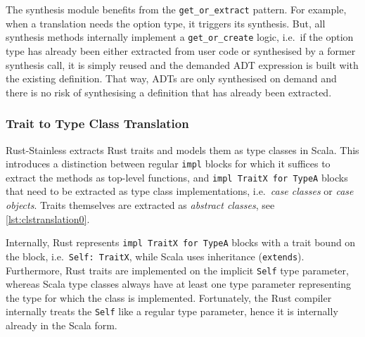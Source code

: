 The synthesis module benefits from the \lstinline!get_or_extract! pattern. For
example, when a translation needs the option type, it triggers its synthesis.
But, all synthesis methods internally implement a \lstinline!get_or_create!
logic, i.e.~if the option type has already been either extracted from user code
or synthesised by a former synthesis call, it is simply reused and the demanded
ADT expression is built with the existing definition. That way, ADTs are only
synthesised on demand and there is no risk of synthesising a definition that has
already been extracted.

\subsubsection{Trait to Type Class Translation}
\label{type-class-extraction}

Rust-Stainless extracts Rust traits and models them as type classes in Scala.
This introduces a distinction between regular \lstinline!impl! blocks for which
it suffices to extract the methods as top-level functions, and
\passthrough{\lstinline!impl TraitX for TypeA!} blocks that need to be extracted
as type class implementations, i.e.~\emph{case classes} or \emph{case objects}.
Traits themselves are extracted as \emph{abstract classes}, see
\autoref{lst:clstranslation0}.

Internally, Rust represents \passthrough{\lstinline!impl TraitX for TypeA!}
blocks with a trait bound on the block, i.e.~\passthrough{\lstinline!Self:
TraitX!}, while Scala uses inheritance (\passthrough{\lstinline!extends!}).
Furthermore, Rust traits are implemented on the implicit \lstinline!Self! type
parameter, whereas Scala type classes always have at least one type parameter
representing the type for which the class is implemented. Fortunately, the Rust
compiler internally treats the \lstinline!Self! like a regular type parameter,
hence it is internally already in the Scala form.

